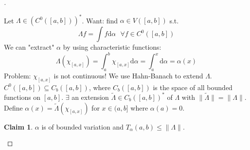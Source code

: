 \documentclass{article}
\theoremstyle{definition}
\newtheorem*{clm}{Claim}
\newenvironment{proofs}[1][\proofname]{%
  \begin{proof}[#1]$ $\par\nobreak\ignorespaces
}{%
  \end{proof}
}
\newcommand{\sfa}{\text{  } \forall}
\begin{document}
\begin{proofs}
	Let $\Lambda \in (C^0([a, b]))^*$.
	Want: find $\alpha \in V([a, b])$ s.t. 
	\[
		\Lambda f = \int f \mathrm{d} \alpha \sfa f \in C^0([a, b])
	\]
	We can "extract" $\alpha$ by using characteristic functions:
	\[
		\Lambda(\chi_{[a, x]}) = \int_a^b \chi_{[a, x]} \mathrm{d} \alpha = \int_a^x \mathrm{d} \alpha = \alpha(x)
	\]
	Problem: $\chi_{[a, x]}$ is not continuous!
	We use Hahn-Banach to extend $\Lambda$.
	$C^0([a, b]) \subseteq C_b([a, b])$, where $C_b([a, b])$ is the space of all bounded functions on $[a, b]$.
	$\exists$ an extension $\tilde{\Lambda} \in C_b([a, b])^*$ of $\Lambda$ with $\|\tilde{\Lambda}\| = \| \Lambda \|$.
	Define $\alpha(x) = \tilde{\Lambda}(\chi_{[a, x]})$ for $x \in (a, b]$ where $\alpha(a) = 0$.

	\begin{clm}
		$\alpha$ is of bounded variation and $T_\alpha(a, b) \leq \| \Lambda \|$.
	\end{clm}


\end{proofs}
\end{document}
